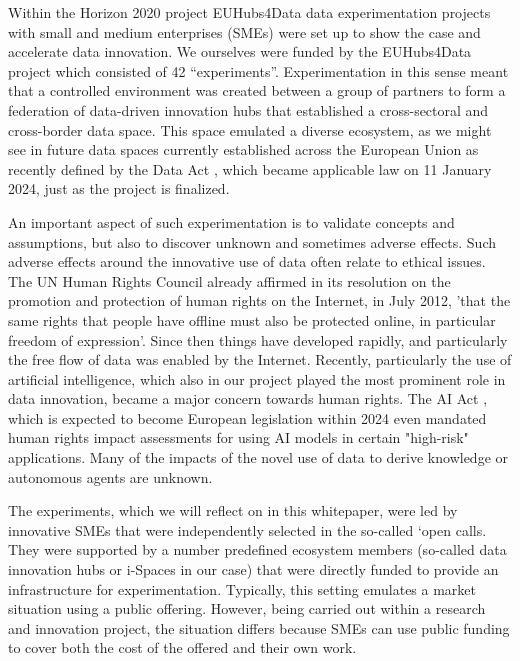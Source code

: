 Within the Horizon 2020 project EUHubs4Data \cite{EUH4D} data experimentation projects
with small and medium enterprises (SMEs) were
set up to show the case and accelerate data innovation. We ourselves
were funded by the EUHubs4Data project which consisted of 42
``experiments''. Experimentation in this sense
meant that a controlled environment was created between a group of partners to form a federation of data-driven innovation hubs
that established a cross-sectoral and cross-border data space. 
This space emulated a diverse ecosystem, as we might see in future data spaces currently established across the European Union as recently defined by the Data Act \cite{}, which became applicable law on 11 January 2024, just as the project is finalized.

An important aspect of such experimentation is to validate concepts and assumptions, but also to discover unknown and sometimes adverse effects.
Such adverse effects around the innovative use of data often relate to ethical issues. The UN Human Rights Council already affirmed in its resolution on the promotion and protection of human rights on the Internet, in July 2012, 'that the same rights that people have offline must also be protected online, in particular freedom of expression'. Since then things have developed rapidly, and particularly the free flow of data was enabled by the Internet. Recently, particularly the use of artificial intelligence, which also in our project played the most prominent role in data innovation, became a major concern towards human rights. The AI Act \cite{AIAct}, which is expected to become European legislation within 2024 even mandated human rights impact assessments for using AI models in certain "high-risk" applications. Many of the impacts of the novel use of data to derive knowledge or autonomous agents are unknown.

The experiments, which we will reflect on in this whitepaper, were led by innovative SMEs that were
independently selected in the so-called `open calls. They were supported by a number predefined ecosystem members (so-called data innovation hubs or i-Spaces
in our case) that were directly funded to provide an infrastructure for
experimentation. Typically, this setting emulates a market situation
using a public offering. However, being carried out within a research
and innovation project, the situation differs because SMEs can use
public funding to cover both the cost of the offered and their own
work.

